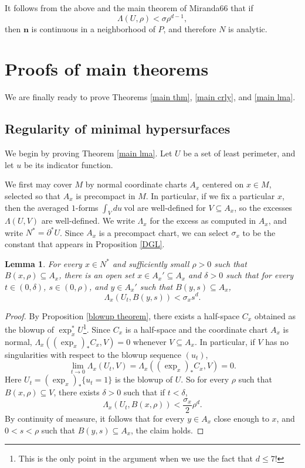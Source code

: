 \documentclass[reqno,12pt,letterpaper]{amsart}
\newcommand{\normal}{\mathbf n}
\newcommand{\vol}{\mathrm{vol}}
\newtheorem{lemma}[theorem]{Lemma}
\theoremstyle{definition}
\numberwithin{equation}{section}
\begin{document}
It follows from the above and the main theorem of Miranda66 that if
$$\Lambda(U, \rho) < \sigma \rho^{d - 1},$$
then $\normal$ is continuous in a neighborhood of $P$, and therefore $N$ is analytic.




\section{Proofs of main theorems}\label{proof of main thm}
We are finally ready to prove Theorems \ref{main thm}, \ref{main crly}, and \ref{main lma}.

\subsection{Regularity of minimal hypersurfaces}
We begin by proving Theorem \ref{main lma}.
Let $U$ be a set of least perimeter, and let $u$ be its indicator function.

We first may cover $M$ by normal coordinate charts $A_x$ centered on $x \in M$, selected so that $A_x$ is precompact in $M$.
In particular, if we fix a particular $x$, then the averaged $1$-forms $\int_V du ~\vol$ are well-defined for $V \subseteq A_x$, so the excesses $\Lambda(U, V)$ are well-defined.
We write $\Lambda_x$ for the excess as computed in $A_x$, and write $N^* = \partial^* U$.
Since $A_x$ is a precompact chart, we can select $\sigma_x$ to be the constant that appears in Proposition \ref{DGL}.

\begin{lemma}
For every $x \in N^*$ and sufficiently small $\rho > 0$ such that $B(x, \rho) \subseteq A_x$, there is an open set $x \in A_x' \subseteq A_x$ and $\delta > 0$ such that for every $t \in (0, \delta)$, $s \in (0, \rho)$, and $y \in A_x'$ such that $B(y, s) \subseteq A_x$,
\begin{equation}\label{basecase}\Lambda_x(U_t, B(y, s)) < \sigma_x s^d.\end{equation}
\end{lemma}
\begin{proof}
By Proposition \ref{blowup theorem}, there exists a half-space $C_x$ obtained as the blowup of $\exp_x^* U$\footnote{This is the only point in the argument when we use the fact that $d \leq 7$!}.
Since $C_x$ is a half-space and the coordinate chart $A_x$ is normal, $\Lambda_x((\exp_x)_* C_x, V) = 0$ whenever $V \subseteq A_x$.
In particular, if $V$ has no singularities with respect to the blowup sequence $(u_t)$,
$$\lim_{t \to 0} \Lambda_x(U_t, V) = \Lambda_x((\exp_x)_* C_x, V) = 0.$$
Here $U_t = (\exp_x)_* \{u_t = 1\}$ is the blowup of $U$.
So for every $\rho$ such that $B(x, \rho) \subseteq V$, there exists $\delta > 0$ such that if $t < \delta$,
$$\Lambda_x(U_t, B(x, \rho)) < \frac{\sigma_x}{2} \rho^d.$$
By continuity of measure, it follows that for every $y \in A_x$ close enough to $x$, and $0 < s < \rho$ such that $B(y, s) \subseteq A_x$, the claim holds.
\end{proof}
\end{document}
